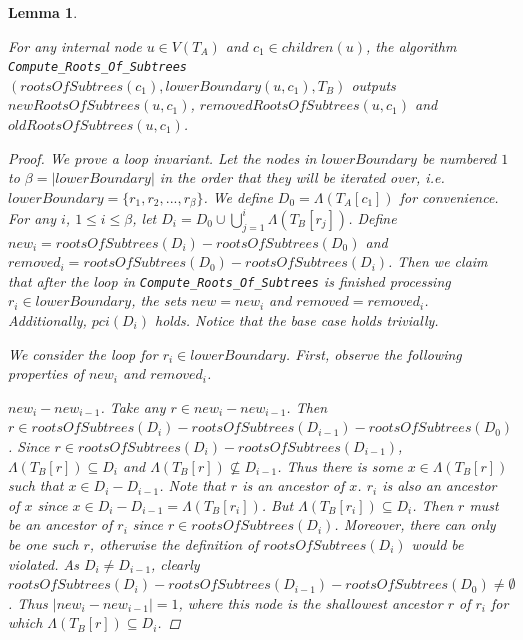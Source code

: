 \documentclass{article}
\newcommand{\leafset}{\Lambda}
\newtheorem{computerootsofsubtreescorrectness}[incompatibility]{Lemma}
\begin{document}
    \bigskip
    \begin{computerootsofsubtreescorrectness}
        \label{lem:computerootsofsubtreescorrectness}

        For any internal node $u \in V(T_A)$ and $c_1 \in children(u)$, the algorithm \texttt{Compute\_Roots\_Of\_Subtrees}$(rootsOfSubtrees(c_1), lowerBoundary(u, c_1), T_B)$ outputs $newRootsOfSubtrees(u, c_1)$, $removedRootsOfSubtrees(u, c_1)$ and $oldRootsOfSubtrees(u, c_1)$.

        \begin{proof}
            We prove a loop invariant. Let the nodes in $lowerBoundary$ be numbered $1$ to $\beta = |lowerBoundary|$ in the order that they will be iterated over, i.e. $lowerBoundary = \{r_1, r_2, ..., r_{\beta}\}$. We define $D_0 = \leafset(T_A[c_1])$ for convenience. For any $i$, $1 \leq i \leq \beta$, let $D_i = D_0 \cup \bigcup_{j = 1}^{i} \leafset(T_B[r_j])$. Define $new_i = rootsOfSubtrees(D_i) - rootsOfSubtrees(D_0)$ and $removed_i = rootsOfSubtrees(D_0) - rootsOfSubtrees(D_i)$. Then we claim that after the loop in \texttt{Compute\_Roots\_Of\_Subtrees} is finished processing $r_i \in lowerBoundary$, the sets $new = new_i$ and $removed = removed_i$. Additionally, $pci(D_i)$ holds. Notice that the base case holds trivially.

            We consider the loop for $r_i \in lowerBoundary$. First, observe the following properties of $new_i$ and $removed_i$.

            \textit{$new_i - new_{i-1}$.} Take any $r \in new_i - new_{i-1}$. Then $r \in rootsOfSubtrees(D_i) - rootsOfSubtrees(D_{i-1}) - rootsOfSubtrees(D_0)$. Since $r \in rootsOfSubtrees(D_i) - rootsOfSubtrees(D_{i-1})$, $\leafset(T_B[r]) \subseteq D_i$ and $\leafset(T_B[r]) \not\subseteq D_{i-1}$. Thus there is some $x \in \leafset(T_B[r])$ such that $x \in D_i - D_{i-1}$. Note that $r$ is an ancestor of $x$. $r_i$ is also an ancestor of $x$ since $x \in D_i - D_{i-1} = \leafset(T_B[r_i])$. But $\leafset(T_B[r_i]) \subseteq D_i$. Then $r$ must be an ancestor of $r_i$ since $r \in rootsOfSubtrees(D_i)$. Moreover, there can only be one such $r$, otherwise the definition of $rootsOfSubtrees(D_i)$ would be violated. As $D_i \neq D_{i-1}$, clearly $rootsOfSubtrees(D_i) - rootsOfSubtrees(D_{i-1}) - rootsOfSubtrees(D_0) \neq \emptyset$. Thus $|new_i - new_{i-1}| = 1$, where this node is the shallowest ancestor $r$ of $r_i$ for which $\leafset(T_B[r]) \subseteq D_i$.


\end{proof}
\end{computerootsofsubtreescorrectness}
\end{document}

